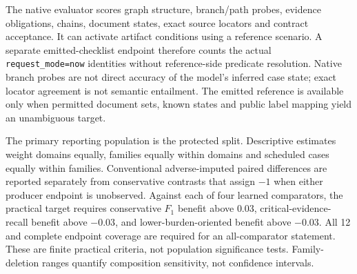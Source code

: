 The native evaluator scores graph structure, branch/path probes, evidence
obligations, chains, document states, exact source locators and contract
acceptance. It can activate artifact conditions using a reference scenario.
A separate emitted-checklist endpoint therefore counts the actual
\texttt{request\_mode=now} identities without reference-side predicate
resolution. Native branch probes are not direct accuracy of the model's
inferred case state; exact locator agreement is not semantic entailment.
The emitted reference is available only when permitted document sets,
known states and public label mapping yield an unambiguous target.

The primary reporting population is the protected split. Descriptive
estimates weight domains equally, families equally within domains and
scheduled cases equally within families. Conventional adverse-imputed
paired differences are reported separately from conservative contrasts
that assign $-1$ when either producer endpoint is unobserved. Against each
of four learned comparators, the practical target requires conservative
$F_1$ benefit above $0.03$, critical-evidence-recall benefit above $-0.03$,
and lower-burden-oriented benefit above $-0.03$. All 12 and complete endpoint
coverage are required for an all-comparator statement. These are finite
practical criteria, not population significance tests. Family-deletion
ranges quantify composition sensitivity, not confidence intervals.
